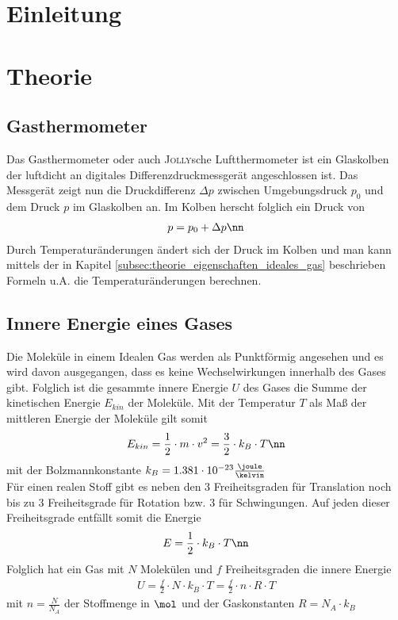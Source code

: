 \documentclass[12pt, a4paper, twoside]{scrartcl}
\newcommand{\person}[1]{\textsc{#1}}
\begin{document}

\cleardoublepage
\tableofcontents
\cleardoublepage
\setcounter{page}{1}

\section{Einleitung}
\label{sec:einleitung}


\section{Theorie}
\label{sec:theorie}

\subsection{Gasthermometer}
Das Gasthermometer oder auch \person{Jolly}sche Luftthermometer ist ein Glaskolben der luftdicht an digitales Differenzdruckmessgerät angeschlossen ist. Das Messgerät zeigt nun die Druckdifferenz $\Delta p$ zwischen Umgebungsdruck $p_0$ und dem Druck $p$ im Glaskolben an. Im Kolben herscht folglich ein Druck von
\begin{align}
 p = p_0 + \Delta p \nn
\end{align}
Durch Temperaturänderungen ändert sich der Druck im Kolben und man kann mittels der in Kapitel \ref{subsec:theorie_eigenschaften_ideales_gas} beschrieben Formeln u.A. die Temperaturänderungen berechnen.

\subsection{Innere Energie eines Gases}
Die Moleküle in einem Idealen Gas werden als Punktförmig angesehen und es wird davon ausgegangen, dass es keine Wechselwirkungen innerhalb des Gases gibt.
Folglich ist die gesammte innere Energie $U$ des Gases die Summe der kinetischen Energie $E_{kin}$ der Moleküle. Mit der Temperatur $T$ als Maß der mittleren Energie der Moleküle gilt somit
\begin{align}
 E_{kin} = \frac{1}{2}\cdot m\cdot v^{2} = \frac{3}{2}\cdot k_B\cdot T \nn
\end{align}
mit der Bolzmannkonstante $k_B=1.381\cdot 10^{-23} \frac{\joule}{\kelvin}$
\\
Für einen realen Stoff gibt es neben den 3 Freiheitsgraden für Translation noch bis zu 3 Freiheitsgrade für Rotation bzw. 3 für Schwingungen.
Auf jeden dieser Freiheitsgrade entfällt somit die Energie
\begin{align}
 E = \frac{1}{2}\cdot k_B\cdot T \nn
\end{align}
Folglich hat ein Gas mit $N$ Molekülen und $f$ Freiheitsgraden die innere Energie
\begin{align}
 U = \frac{f}{2}\cdot N\cdot k_B\cdot T = \frac{f}{2}\cdot n\cdot R\cdot T \label{eq:U}
\end{align}
mit $n = \frac{N}{N_A}$ der Stoffmenge in $\mol$ und  der Gaskonstanten $R = N_A\cdot k_B$
\end{document}
